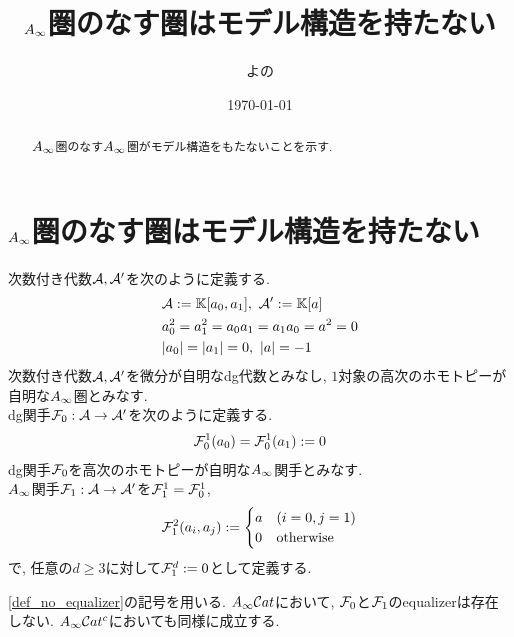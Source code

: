 \documentclass[uplatex, a4paper, 14Q, dvipdfmx]{jsarticle}
\title{\texorpdfstring{$A_{\infty}$}{Ainf}圏のなす圏はモデル構造を持たない}
\author{よの}
\date{\today}
\begin{document}
\maketitle

\begin{abstract}
  $A_{\infty}$圏のなす$A_{\infty}$圏がモデル構造をもたないことを示す. 
\end{abstract}

\tableofcontents

\section{\texorpdfstring{$A_{\infty}$}{Ainf}圏のなす圏はモデル構造を持たない}

\begin{definition} \label{def_no_equalizer}
  次数付き代数$\mathcal{A},\mathcal{A}'$を次のように定義する. 
  \begin{align*}
    &\mathcal{A} := \mathbb{K}[a_0,a_1], ~ \mathcal{A}' := \mathbb{K}[a] \\
    &a_0^2 = a_1^2 = a_0 a_1 = a_1 a_0 = a^2 = 0 \\
    &|a_0| = |a_1| = 0, ~ |a| = -1
  \end{align*}
  次数付き代数$\mathcal{A},\mathcal{A}'$を微分が自明なdg代数とみなし, $1$対象の高次のホモトピーが自明な$A_{\infty}$圏とみなす.\\
  dg関手$\mathcal{F}_0 : \mathcal{A} \to \mathcal{A}'$を次のように定義する.
  \begin{align*}
    \mathcal{F}_0^1(a_0) = \mathcal{F}_0^1(a_1) := 0
  \end{align*}
  dg関手$\mathcal{F}_0$を高次のホモトピーが自明な$A_{\infty}$関手とみなす. \\
  $A_{\infty}$関手$\mathcal{F}_1 : \mathcal{A} \to \mathcal{A}'$を$\mathcal{F}_1^1 = \mathcal{F}_0^1$, 
  \begin{align*}
    \mathcal{F}_1^2(a_i,a_j) := 
    \begin{cases}
      a & (i=0, j=1) \\
      0 & \mathrm{otherwise}
    \end{cases}
  \end{align*}
  で, 任意の$d \geq 3$に対して$\mathcal{F}_1^d := 0$として定義する.
\end{definition}

\begin{lemma}
  \cref{def_no_equalizer}の記号を用いる.  
  $A_{\infty}\mathcal{C} at$において, $\mathcal{F}_0$と$\mathcal{F}_1$のequalizerは存在しない. 
  $A_{\infty}\mathcal{C} at^c$においても同様に成立する.
\end{lemma}
\end{document}

